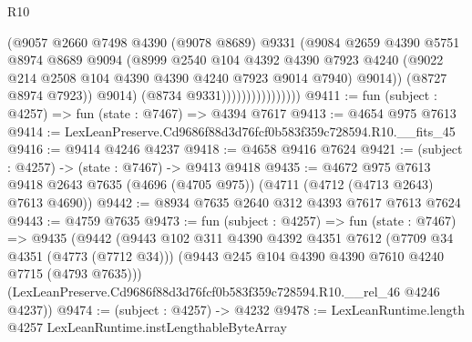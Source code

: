 \begin{lexlean}{R10}
\begin{coremodule}
                                    (@9057
                                      @2660
                                      @7498
                                      @4390
                                      (@9078 @8689)
                                      @9331
                                      (@9084
                                        @2659
                                        @4390
                                        @5751
                                        @8974
                                        @8689
                                        @9094
                                        (@8999
                                          @2540
                                          @104
                                          @4392
                                          @4390
                                          @7923
                                          @4240
                                          (@9022
                                            @214
                                            @2508
                                            @104
                                            @4390
                                            @4390
                                            @4240
                                            @7923
                                            @9014
                                            @7940)
                                          @9014))
                                      (@8727 @8974 @7923))
                                    @9014)
                                  (@8734 @9331))))))))))))))))
@9411 := fun (subject : @4257) => fun (state : @7467) => @4394 @7617
@9413 := @4654 @975 @7613
@9414 := LexLeanPreserve.Cd9686f88d3d76fcf0b583f359c728594.R10.__fits_45
@9416 := @9414 @4246 @4237
@9418 := @4658 @9416 @7624
@9421 := (subject : @4257) -> (state : @7467) -> @9413 @9418
@9435 := @4672
    @975
    @7613
    @9418
    @2643
    @7635
    (@4696 (@4705 @975))
    (@4711 (@4712 (@4713 @2643) @7613 @4690))
@9442 := @8934 @7635 @2640 @312 @4393 @7617 @7613 @7624
@9443 := @4759 @7635
@9473 := fun (subject : @4257) =>
  fun (state : @7467) =>
  @9435
    (@9442
      (@9443
        @102
        @311
        @4390
        @4392
        @4351
        @7612
        (@7709 @34 @4351 (@4773 (@7712 @34)))
        (@9443 @245 @104 @4390 @4390 @7610 @4240 @7715 (@4793 @7635)))
      (LexLeanPreserve.Cd9686f88d3d76fcf0b583f359c728594.R10.__rel_46 @4246 @4237))
@9474 := (subject : @4257) -> @4232
@9478 := LexLeanRuntime.length @4257 LexLeanRuntime.instLengthableByteArray

\end{coremodule}
\end{lexlean}
